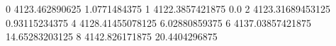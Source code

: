 0 4123.462890625 1.0771484375
1 4122.3857421875 0.0
2 4123.31689453125 0.93115234375
4 4128.41455078125 6.02880859375
6 4137.03857421875 14.65283203125
8 4142.826171875 20.4404296875
